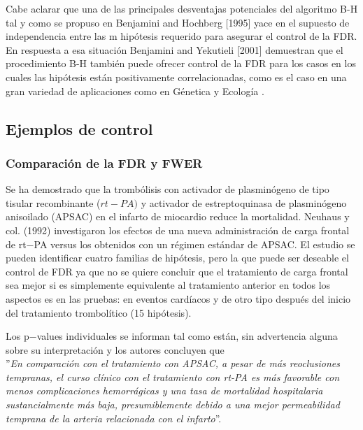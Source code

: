 \documentclass[11pt,letterpaper]{article}
\begin{document}
Cabe aclarar que una de las principales desventajas potenciales del algoritmo B-H tal y como se propuso en Benjamini and Hochberg [1995] yace en el supuesto de independencia entre las m hipótesis requerido para asegurar el control de la FDR. En respuesta a esa situación Benjamini and Yekutieli [2001] demuestran que el procedimiento B-H también puede ofrecer control de la FDR para los casos en los cuales las hipótesis están positivamente correlacionadas, como es el caso en una gran variedad de aplicaciones como en Génetica y Ecología \cite{tesis_cimat_selecc}. 

\subsection{Ejemplos de control}

\subsubsection*{Comparación de la FDR y FWER}
Se ha demostrado que la trombólisis con activador de plasminógeno de tipo tisular recombinante ($rt-PA)$ y activador de estreptoquinasa de plasminógeno anisoilado (APSAC) en el infarto de miocardio reduce la mortalidad. Neuhaus y col. (1992) investigaron los efectos de una nueva administración de carga frontal de rt$-$PA versus los obtenidos con un régimen estándar de APSAC. El estudio se pueden identificar cuatro familias de hipótesis, pero la que puede ser deseable el control de FDR ya que no se quiere concluir que el tratamiento de carga frontal sea mejor si es simplemente equivalente al tratamiento anterior en todos los aspectos es en las pruebas: en eventos cardíacos y de otro tipo después del inicio del tratamiento trombolítico (15 hipótesis).

Los p$-$values individuales se informan tal como están, sin advertencia alguna sobre su interpretación y los autores concluyen que\\

''\textit{En comparación con el tratamiento con APSAC, a pesar de más reoclusiones tempranas, el curso clínico con el tratamiento con rt-PA es más favorable con menos complicaciones hemorrágicas y una tasa de mortalidad hospitalaria sustancialmente más baja, presumiblemente debido a una mejor permeabilidad temprana de la arteria relacionada con el infarto}''.\\
\end{document}
